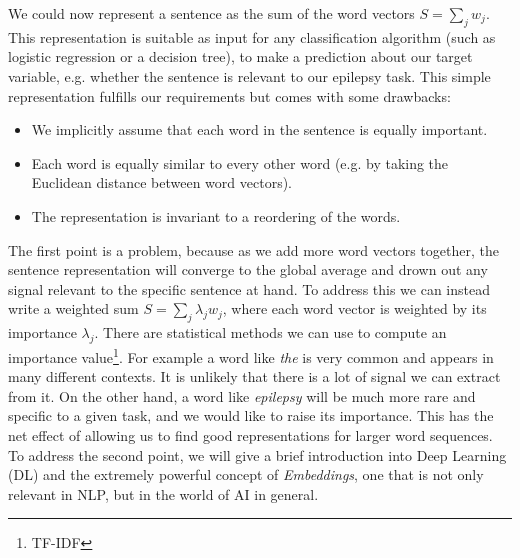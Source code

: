 We could now represent a sentence as the sum of the word vectors $S = \sum_j w_j$. This representation is suitable as input for any classification algorithm (such as logistic regression or a decision tree), to make a prediction about our target variable, e.g. whether the sentence is relevant to our epilepsy task.
This simple representation fulfills our requirements but comes with some drawbacks:
\begin{itemize}
    \item We implicitly assume that each word in the sentence is equally important.
    \item Each word is equally similar to every other word (e.g. by taking the Euclidean distance between word vectors).
    \item The representation is invariant to a reordering of the words.
\end{itemize}
The first point is a problem, because as we add more word vectors together, the sentence representation will converge to the global average and drown out any signal relevant to the specific sentence at hand.
To address this we can instead write a weighted sum $S = \sum_j \lambda_j w_j$, where each word vector is weighted by its importance $\lambda_j$. There are statistical methods we can use to compute an importance value\footnote{TF-IDF}.
For example a word like \textit{the} is very common and appears in many different contexts.
It is unlikely that there is a lot of signal we can extract from it.
On the other hand, a word like \textit{epilepsy} will be much more rare and specific to a given task, and we would like to raise its importance.
This has the net effect of allowing us to find good representations for larger word sequences.
To address the second point, we will give a brief introduction into Deep Learning (DL) and the extremely powerful concept of \textit{Embeddings}, one that is not only relevant in NLP, but in the world of AI in general.
